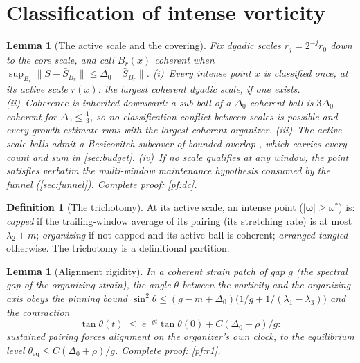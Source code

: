 \documentclass[11pt,letterpaper]{amsart}
\newtheorem{lemma}[theorem]{Lemma}
\theoremstyle{definition}
\newtheorem{definition}[theorem]{Definition}
\theoremstyle{remark}
\newcommand{\om}{\omega}
\newcommand{\vort}{\boldsymbol{\omega}}
\newcommand{\norm}[1]{\lVert #1 \rVert}
\newcommand{\abs}[1]{\lvert #1 \rvert}
\begin{document}
\section{Classification of intense vorticity}\label{sec:classification}

\begin{lemma}[The active scale and the covering]\label{lem:dc}
Fix dyadic scales $r_j=2^{-j}r_0$ down to the core scale, and call $B_r(x)$
\emph{coherent} when $\sup_{B_r}\norm{S-\bar S_{B_r}}\le\Delta_0\norm{\bar S_{B_r}}$.
\textup{(i)}~Every intense point $x$ is classified once, at its \emph{active scale}
$r(x)$: the largest coherent dyadic scale, if one exists. \textup{(ii)}~Coherence is
inherited downward: a sub-ball of a $\Delta_0$-coherent ball is $3\Delta_0$-coherent
for $\Delta_0\le\tfrac13$, so no classification conflict between scales is possible
and every growth estimate runs with the largest coherent organizer. \textup{(iii)}~The
active-scale balls admit a Besicovitch subcover of bounded overlap
\cite{Mattila1995}, which carries every count and sum in \cref{sec:budget}.
\textup{(iv)}~If no scale qualifies at any window, the point satisfies verbatim the
multi-window maintenance hypothesis consumed by the funnel (\cref{sec:funnel}).
Complete proof: \cref{pf:dc}.
\end{lemma}

\begin{definition}[The trichotomy]\label{def:trichotomy}
At its active scale, an intense point ($\abs{\vort}\ge\om^*$) is: \emph{capped} if the
trailing-window average of its pairing (its stretching rate) is at most
$\lambda_2+m$; \emph{organizing} if not capped and its active ball is coherent;
\emph{arranged-tangled} otherwise. The trichotomy is a definitional partition.
\end{definition}

\begin{lemma}[Alignment rigidity]\label{lem:r1}
In a coherent strain patch of gap $g$ (the spectral gap of the organizing strain), the
angle $\theta$ between the vorticity and the organizing axis obeys the pinning bound
$\sin^2\theta\le(g-m+\Delta_0)\bigl(1/g+1/(\lambda_1-\lambda_3)\bigr)$ and the
contraction
\[
\tan\theta(t)\;\le\;e^{-gt}\tan\theta(0)+C(\Delta_0+\rho)/g :
\]
sustained pairing forces alignment on the organizer's own clock, to the equilibrium
level $\theta_{\mathrm{eq}}\le C(\Delta_0+\rho)/g$. Complete proof: \cref{pf:r1}.
\end{lemma}
\end{document}
